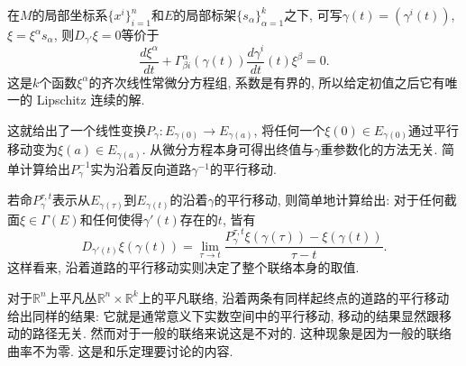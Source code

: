 在$M$的局部坐标系$\{x^i\}_{i=1}^n$和$E$的局部标架$\{s_{\alpha}\}_{\alpha=1}^k$之下, 可写$\gamma(t)=(\gamma^i(t))$, $\xi=\xi^\alpha s_\alpha$, 则$D_{\gamma'}\xi=0$等价于
$$
\frac{d\xi^\alpha}{dt}+\Gamma_{\beta i}^\alpha(\gamma(t))\frac{d\gamma^i}{dt}(t)\xi^\beta=0.
$$
这是$k$个函数$\xi^\alpha$的齐次线性常微分方程组, 系数是有界的, 所以给定初值之后它有唯一的 Lipschitz 连续的解. 

这就给出了一个线性变换$P_{\gamma}:E_{\gamma(0)}\to E_{\gamma(a)}$, 将任何一个$\xi(0)\in E_{\gamma(0)}$通过平行移动变为$\xi(a)\in E_{\gamma(a)}$. 从微分方程本身可得出终值与$\gamma$重参数化的方法无关. 简单计算给出$P_\gamma^{-1}$实为沿着反向道路$\gamma^{-1}$的平行移动. 

若命$P_\gamma^{\tau,t}$表示从$E_{\gamma(\tau)}$到$E_{\gamma(t)}$的沿着$\gamma$的平行移动, 则简单地计算给出: 对于任何截面$\xi\in\Gamma(E)$和任何使得$\gamma'(t)$存在的$t$, 皆有
$$
D_{\gamma'(t)}\xi(\gamma(t))=\lim_{\tau\to t}\frac{P_\gamma^{\tau,t}\xi(\gamma(\tau))-\xi(\gamma(t))}{\tau-t}.
$$
这样看来, 沿着道路的平行移动实则决定了整个联络本身的取值.

对于$\mathbb{R}^n$上平凡丛$\mathbb{R}^n\times\mathbb{R}^k$上的平凡联络, 沿着两条有同样起终点的道路的平行移动给出同样的结果: 它就是通常意义下实数空间中的平行移动, 移动的结果显然跟移动的路径无关. 然而对于一般的联络来说这是不对的. 这种现象是因为一般的联络曲率不为零. 这是和乐定理要讨论的内容.